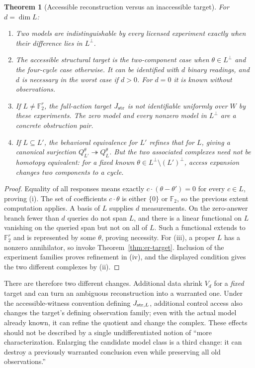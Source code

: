 \documentclass[11pt]{article}
\newtheorem{theorem}{Theorem}[section]
\theoremstyle{definition}
\begin{document}
\begin{theorem}[Accessible reconstruction versus an inaccessible target]
\label{thm:er-access}
For $d=\dim L$:
\begin{enumerate}[label=(\roman*)]
\item Two models are indistinguishable by every licensed experiment exactly
when their difference lies in $L^\perp$.
\item The accessible structural target is the two-component case when
$\theta\in L^\perp$ and the four-cycle case otherwise. It can be identified
with $d$ binary readings, and $d$ is necessary in the worst case if $d>0$.
For $d=0$ it is known without observations.
\item If $L\ne\mathbb F_2^r$, the full-action target $J_{\rm str}$ is not
identifiable uniformly over $W$ by these experiments. The zero model and
every nonzero model in $L^\perp$ are a concrete obstruction pair.
\item If $L\subseteq L'$, the behavioral equivalence for $L'$ refines that
for $L$, giving a canonical surjection $Q_{L'}^\theta\twoheadrightarrow
Q_L^\theta$. But the two associated complexes need not be homotopy
equivalent: for a fixed known $\theta\in L^\perp\setminus (L')^\perp$,
access expansion changes two components to a cycle.
\end{enumerate}
\end{theorem}
\begin{proof}
Equality of all responses means exactly
$c\cdot(\theta-\theta')=0$ for every $c\in L$, proving (i).
The set of coefficients $c\cdot\theta$ is either $\{0\}$ or $\mathbb F_2$,
so the previous extent computation applies. A basis of $L$ supplies $d$
measurements. On the zero-answer branch fewer than $d$ queries do not span
$L$, and there is a linear functional on $L$ vanishing on the queried
span but not on all of $L$. Such a functional extends to
$\mathbb F_2^r$ and is represented by some $\theta$, proving necessity.
For (iii), a proper $L$ has a nonzero annihilator, so invoke
Theorem~\ref{thm:er-target}. Inclusion of the experiment families proves
refinement in (iv), and the displayed condition gives the two different
complexes by (ii).
\end{proof}

There are therefore two different changes. Additional data shrink $V_d$
for a \emph{fixed} target and can turn an ambiguous reconstruction into a
warranted one. Under the accessible-witness convention defining $J_{{\rm str},L}$, additional control access also changes the target's defining
observation family; even with the actual model already known, it can refine
the quotient and change the complex. These effects should not be described
by a single undifferentiated notion of ``more characterization. Enlarging
the candidate model class is a third change: it can destroy a previously
warranted conclusion even while preserving all old observations.''
\end{document}
